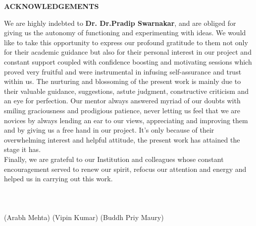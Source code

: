 
\newpage
\begin{center}
{\large \bf ACKNOWLEDGEMENTS}
\end{center}
We are highly indebted to {\bf Dr. Dr.Pradip Swarnakar}, and are obliged for giving us the autonomy of
functioning and experimenting with ideas. We would like to take this opportunity to express our profound gratitude to them
not only for their academic guidance but also for their personal interest in our project and constant support coupled with
confidence boosting and motivating sessions which proved very fruitful and were instrumental in infusing self-assurance
and trust within us. The nurturing and blossoming of the present work is mainly due to their valuable guidance,
suggestions, astute judgment, constructive criticism and an eye for perfection. Our mentor always answered myriad of our
doubts with smiling graciousness and prodigious patience, never letting us feel that we are novices by always lending an
ear to our views, appreciating and improving them and by giving us a free hand in our project. It's only
because of their overwhelming interest and helpful attitude, the present work has attained the stage it has. \\
Finally, we are grateful to our Institution and colleagues whose constant encouragement served to renew our spirit,
refocus our attention and energy and helped us in carrying out this work.\\ \\ \\ \\
(Arabh Mehta) \hspace{1in} (Vipin Kumar) \hspace{1in} (Buddh Priy Maury)
